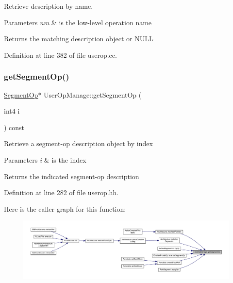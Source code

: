 Retrieve description by name. 


\begin{DoxyParams}{Parameters}
{\em nm} & is the low-\/level operation name \\
\hline
\end{DoxyParams}
\begin{DoxyReturn}{Returns}
the matching description object or N\+U\+LL 
\end{DoxyReturn}


Definition at line 382 of file userop.\+cc.

\mbox{\label{class_user_op_manage_a59f67a150f53117fc159be3e66721640}} 
\subsubsection{\texorpdfstring{getSegmentOp()}{getSegmentOp()}}
{\footnotesize\ttfamily \mbox{\hyperlink{class_segment_op}{Segment\+Op}}$\ast$ User\+Op\+Manage\+::get\+Segment\+Op (\begin{DoxyParamCaption}\item[{int4}]{i }\end{DoxyParamCaption}) const\hspace{0.3cm}{\ttfamily [inline]}}

Retrieve a segment-\/op description object by index 
\begin{DoxyParams}{Parameters}
{\em i} & is the index \\
\hline
\end{DoxyParams}
\begin{DoxyReturn}{Returns}
the indicated segment-\/op description 
\end{DoxyReturn}


Definition at line 282 of file userop.\+hh.

Here is the caller graph for this function\+:
\nopagebreak
\begin{figure}[H]
\begin{center}
\leavevmode
\includegraphics[width=350pt]{class_user_op_manage_a59f67a150f53117fc159be3e66721640_icgraph}
\end{center}
\end{figure}
\mbox{\label{class_user_op_manage_a200fcd7fcd664e36bb390509170cd4f6}} 
